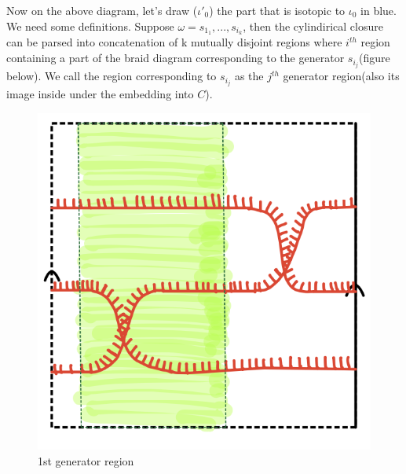 Now on the above diagram, let's draw ($\iota'_0$) the part that is isotopic to $\iota_0$ in blue. We need some definitions.
Suppose $\omega = s_{1_1},..., s_{i_k}$, then the cylindirical closure can be parsed into concatenation of k mutually disjoint regions where $i^{th}$ region containing a part of the braid diagram corresponding to the generator $s_{i_j}$(figure below). We call the region corresponding to $s_{i_j}$ as the $j^{th}$ generator region(also its image inside under the embedding into $C$).
\begin{figure}[H] %
    \centering
    \includegraphics[scale = 0.95]{diagrams/natural_alternating_diagrams/6-1.png} %
    \caption{1st generator region}
    \label{fig:your-label}
\end{figure}

